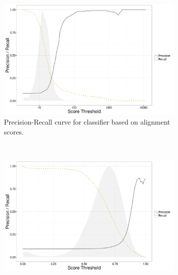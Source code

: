 \documentclass[12pt]{article} %
\begin{document}

\begin{figure}[ht!]
    \centering
    \begin{subfigure}[t]{0.5\textwidth}
        \centering
        \includegraphics[width=\textwidth]{figures/ncsl_pr_nosplit.png}
        \caption{Precision-Recall curve for classifier based on alignment scores.}
    \end{subfigure}%
    ~ 
    \begin{subfigure}[t]{0.5\textwidth}
        \centering
        \includegraphics[width=\textwidth]{figures/ncsl_pr_cosm.png}

\end{subfigure}
\end{figure}
\end{document}
